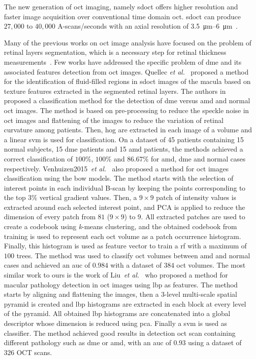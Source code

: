 The new generation of \ac{oct} imaging, namely \ac{sdoct} offers higher resolution and faster image acquisition over conventional time domain \ac{oct}. \Ac{sdoct} can produce $27,000$ to $40,000$ A-scans/seconds with an axial resolution of \SIrange{3.5}{6}{\micro \metre}~\cite{Chen2005}. 

Many of the previous works on \ac{oct} image analysis have focused on the problem of retinal layers segmentation, which is a necessary step for retinal thickness measurements~\cite{Chiu2010,Kafieh2013}.
Few works have addressed the specific problem of \ac{dme} and its associated features detection from \ac{oct} images. Quellec \textit{et al.}~\cite{Quellec2010} proposed a method for the identification of fluid-filled regions in \ac{sdoct} images of the macula based on texture features extracted in the segmented retinal layers.
The authors in~\cite{Srinivasan2014} proposed a classification method for the detection of \ac{dme} versus \ac{amd} and normal \ac{oct} images. The method is based on pre-processing to reduce the speckle noise in \ac{oct} images and flattening of the images to reduce the variation of retinal curvature among patients. Then, \ac{hog} are extracted in each image of a volume and a linear \ac{svm} is used for classification. On a dataset of 45 patients containing 15 normal subjects, 15 \ac{dme} patients and 15 \ac{amd} patients, the methods achieved a correct classification of $100 \%$, $100 \%$ and $86.67 \%$ for \ac{amd}, \ac{dme} and normal cases respectively. 
Venhuizen2015~\textit{et al.}~\cite{Venhuizen2015} also proposed a method for \ac{oct} images classification using the \ac{bow} models.
The method starts with the selection of interest points in each individual B-scan by keeping the points corresponding to the top $3 \%$ vertical gradient values. Then, a $ 9\times 9$ patch of intensity values is extracted around each selected interest point, and PCA is applied to reduce the dimension of every patch from $81$ ($9\times 9$) to $9$. 
All extracted patches are used to create a codebook using \textit{k}-means clustering, and the obtained codebook from training is used to represent each \ac{oct} volume as a patch occurrence histogram. Finally, this histogram is used as feature vector to train a \ac{rf} with a maximum of $100$ trees. The method was used to classify \ac{oct} volumes between \ac{amd} and normal cases and achieved an \ac{auc} of $0.984$ with a dataset of $384$ \ac{oct} volumes. 
The most similar work to ours is the work of Liu~\textit{et al.}~\cite{Liu2011} who proposed a method for macular pathology detection in \ac{oct} images using \ac{lbp} as features.
The method starts by aligning and flattening the images, then a $3$-level multi-scale spatial pyramid is created and \ac{lbp} histograms are extracted in each block at every level of the pyramid. All obtained \ac{lbp} histograms are concatenated into a global descriptor whose dimension is reduced using \ac{pca}. Finally a \ac{svm} is used as classifier. The method achieved good results in detection \ac{oct} scan containing different pathology such as \ac{dme} or \ac{amd}, with an \ac{auc} of $0.93$ using a dataset of $326$ OCT scans.  


